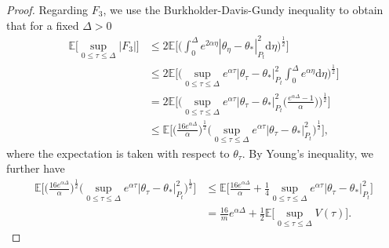 \documentclass[11pt]{article}
\theoremstyle{plain}
\theoremstyle{definition}
\theoremstyle{remark}
\begin{document}
\begin{proof}
Regarding $F_3$, we use the Burkholder-Davis-Gundy inequality \cite{ren2008burkholder} to obtain that for a fixed $\Delta>0$
\begin{equation}\nonumber
\begin{split}
    \mathbb{E}\Big[\sup_{0\leq \tau \leq \Delta} |F_3|\Big] &\leq 2 \mathbb{E}\bigg[ \bigg(\int_0^\Delta e^{2\alpha \eta}|\theta_\eta-\theta_*|_{P_t}^2 \mathrm{d}\eta\bigg)^{\frac{1}{2}}\bigg]\\
    &\leq 2 \mathbb{E}\bigg[\bigg(\sup_{0\leq \tau \leq \Delta}e^{\alpha \tau}|\theta_\tau-\theta_*|_{P_t}^2 \int_0^\Delta e^{\alpha \eta}\mathrm{d} \eta\bigg)^{\frac{1}{2}}\bigg]\\
    & = 2 \mathbb{E}\bigg[\bigg(\sup_{0\leq \tau \leq \Delta}e^{\alpha \tau}|\theta_\tau-\theta_*|_{P_t}^2 \bigg(\frac{e^{\alpha \Delta}-1}{\alpha}\bigg)\bigg)^{\frac{1}{2}}\bigg]\\
    & \leq \mathbb{E} \bigg[\bigg(\frac{16 e^{\alpha \Delta}}{\alpha}\bigg)^{\frac{1}{2}}\Big (\sup_{0\leq \tau \leq \Delta}e^{\alpha \tau}|\theta_\tau-\theta_*|_{P_t}^2 \Big )^{\frac{1}{2}} \bigg],
\end{split}
\end{equation}
where the expectation is taken with respect to $\theta_\tau$.
By Young's inequality, we further have
\begin{equation}\nonumber
\begin{split}
    \mathbb{E} \bigg[\bigg(\frac{16 e^{\alpha \Delta}}{\alpha}\bigg)^{\frac{1}{2}}\Big (\sup_{0\leq \tau \leq \Delta}e^{\alpha \tau}|\theta_\tau-\theta_*|_{P_t}^2 \Big )^{\frac{1}{2}} \bigg]&\leq \mathbb{E}\bigg[\frac{16 e^{\alpha \Delta}}{\alpha} + \frac{1}{4}\sup_{0\leq \tau \leq \Delta}e^{\alpha \tau}|\theta_\tau-\theta_*|_{P_t}^2  \bigg]\\
    &= \frac{16}{m} e^{\alpha \Delta} + \frac{1}{2}\mathbb{E}\bigg[\sup_{0 \leq \tau \leq \Delta}V(\tau)\bigg].
\end{split}
\end{equation}


\end{proof}
\end{document}
